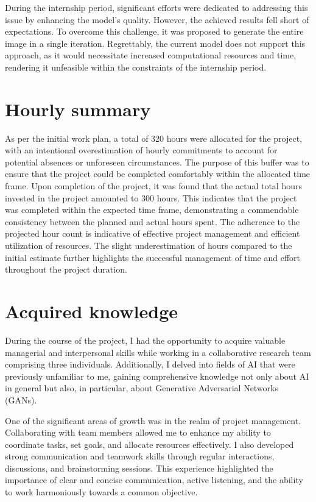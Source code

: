 During the internship period, significant efforts were dedicated to addressing this issue by enhancing the model's quality. 
However, the achieved results fell short of expectations. To overcome this challenge, it was proposed to generate the entire image in a single iteration. 
Regrettably, the current model does not support this approach, as it would necessitate increased computational resources and time, rendering it unfeasible within the constraints of the internship period.
\section{Hourly summary}
As per the initial work plan, a total of 320 hours were allocated for the project, with an intentional overestimation of hourly commitments to account for potential absences or unforeseen circumstances. 
The purpose of this buffer was to ensure that the project could be completed comfortably within the allocated time frame.
Upon completion of the project, it was found that the actual total hours invested in the project amounted to 300 hours. 
This indicates that the project was completed within the expected time frame, demonstrating a commendable consistency between the planned and actual hours spent.
The adherence to the projected hour count is indicative of effective project management and efficient utilization of resources. 
The slight underestimation of hours compared to the initial estimate further highlights the successful management of time and effort throughout the project duration.
\section{Acquired knowledge}
During the course of the project, I had the opportunity to acquire valuable managerial and interpersonal skills while working in a collaborative research team comprising three individuals. 
Additionally, I delved into fields of AI that were previously unfamiliar to me, gaining comprehensive knowledge not only about AI in general but also, in particular, about Generative Adversarial Networks (GANs).

One of the significant areas of growth was in the realm of project management. Collaborating with team members allowed me to enhance my ability to coordinate tasks, set goals, and allocate resources effectively. 
I also developed strong communication and teamwork skills through regular interactions, discussions, and brainstorming sessions. 
This experience highlighted the importance of clear and concise communication, active listening, and the ability to work harmoniously towards a common objective.

